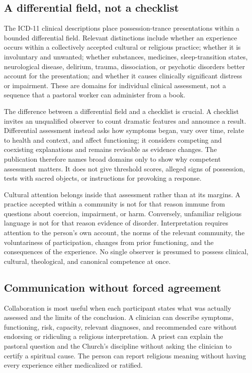 \subsection{A differential field, not a checklist}

The ICD-11 clinical descriptions place possession-trance presentations within
a bounded differential field. Relevant distinctions include whether an
experience occurs within a collectively accepted cultural or religious
practice; whether it is involuntary and unwanted; whether substances,
medicines, sleep-transition states, neurological disease, delirium, trauma,
dissociation, or psychotic disorders better account for the presentation; and
whether it causes clinically significant distress or impairment. These are
domains for individual clinical assessment, not a sequence that a pastoral
worker can administer from a book.

The difference between a differential field and a checklist is crucial. A
checklist invites an unqualified observer to count dramatic features and
announce a result. Differential assessment instead asks how symptoms began,
vary over time, relate to health and context, and affect functioning; it
considers competing and coexisting explanations and remains revisable as
evidence changes. The publication therefore names broad domains only to show
why competent assessment matters. It does not give threshold scores, alleged
signs of possession, tests with sacred objects, or instructions for provoking
a response.

Cultural attention belongs inside that assessment rather than at its margins.
A practice accepted within a community is not for that reason immune from
questions about coercion, impairment, or harm. Conversely, unfamiliar
religious language is not for that reason evidence of disorder. Interpretation
requires attention to the person's own account, the norms of the relevant
community, the voluntariness of participation, changes from prior functioning,
and the consequences of the experience. No single observer is presumed to
possess clinical, cultural, theological, and canonical competence at once.

\subsection{Communication without forced agreement}

Collaboration is most useful when each participant states what was actually
assessed and the limits of the conclusion. A clinician can describe symptoms,
functioning, risk, capacity, relevant diagnoses, and recommended care without
endorsing or ridiculing a religious interpretation. A priest can explain the
pastoral question and the Church's discipline without asking the clinician to
certify a spiritual cause. The person can report religious meaning without
having every experience either medicalized or ratified.

